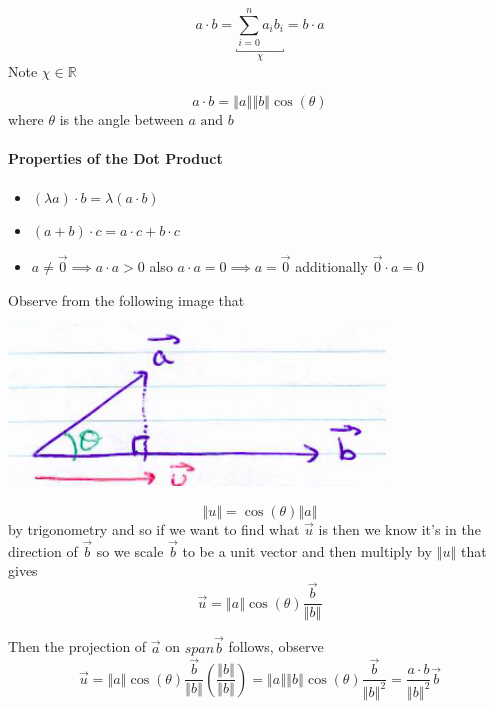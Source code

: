 \documentclass[11pt]{book}
\begin{document}
\begin{defn}\label{defn:dot_product}
    \[
    a \cdot b = \underbracket{\sum_{i=0}^{n} a_{i} b_{i}}_{\chi}  = b \cdot a 
    \]
    Note $\chi \in \mathbb{R} $ 
\end{defn}

\begin{defn}\label{defn:dot_product_geometric_}
    \[
    a \cdot b= \left\Vert a \right\Vert \left\Vert b \right\Vert \cos  \left( \theta \right) 
    \]
    where $\theta$ is the angle between $a \text{ and } b$ 
\end{defn}


\paragraph{Properties of the Dot Product} 
\begin{itemize}
    \item $\left( \lambda a \right)  \cdot b= \lambda \left( a  \cdot b \right) $ 
    \item $\left( a + b \right)  \cdot c= a \cdot c + b \cdot c$ 
    \item $a\neq \vec{0} \implies a \cdot a > 0$ also $a \cdot a = 0 \implies a = \vec{0} $ additionally $\vec{0}  \cdot a = 0$ 
\end{itemize}

Observe from the following image that
\begin{center}
    \includegraphics[width=100mm]{assets/lec1_orth.png} 
\end{center}
\[
\left\Vert u \right\Vert = \cos  \left( \theta \right) \left\Vert a \right\Vert 
\]
by trigonometry and so if we want to find what $\vec{u} $ is then we know it's in the direction of $\vec{b} $ so we scale $\vec{b} $ to be a unit vector and then multiply by $\left\Vert u \right\Vert $ that gives
\[
\vec{u} = \left\Vert a \right\Vert \cos  \left( \theta \right) \frac{\vec{b} }{\left\Vert b \right\Vert }
\]

Then the projection of $\vec{a} $ on $\mathit{span} {\vec{b} } $ follows, observe 
\[
    \vec{u} = \left\Vert a \right\Vert \cos  \left( \theta \right) \frac{\vec{b} }{\left\Vert b \right\Vert } \left( \frac{\left\Vert b \right\Vert }{\left\Vert b \right\Vert } \right) = \left\Vert a \right\Vert \left\Vert b \right\Vert \cos  \left( \theta \right) \frac{\vec{b} }{\left\Vert b \right\Vert ^2 }= \frac{a \cdot b}{\left\Vert b \right\Vert ^2 }\vec{b} 
\]
\end{document}
